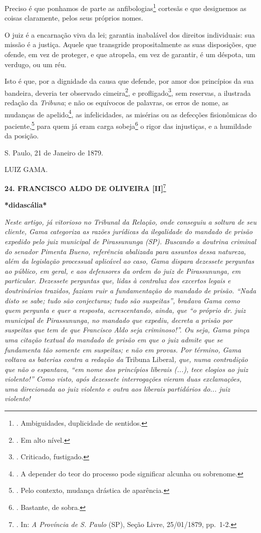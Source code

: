 Preciso é que ponhamos de parte as anfibologias\footnote{. Ambiguidades,
  duplicidade de sentidos.} cortesãs e que designemos as coisas
claramente, pelos seus próprios nomes.

O juiz é a encarnação viva da lei; garantia inabalável dos direitos
individuais: sua missão é a justiça. Aquele que transgride
propositalmente as suas disposições, que ofende, em vez de proteger, e
que atropela, em vez de garantir, é um déspota, um verdugo, ou um réu.

Isto é que, por a dignidade da causa que defende, por amor dos
princípios da sua bandeira, deveria ter observado cimeira\footnote{. Em
  alto nível.}, e profligado\footnote{. Criticado, fustigado.}, sem
reservas, a ilustrada redação da \emph{Tribuna}; e não os equívocos de
palavras, os erros de nome, as mudanças de apelido\footnote{. A depender
  do teor do processo pode significar alcunha ou sobrenome.}, as
infelicidades, as misérias ou as defecções fisionômicas do
paciente,\footnote{. Pelo contexto, mudança drástica de aparência.} para
quem já eram carga sobeja\footnote{. Bastante, de sobra.} o rigor das
injustiças, e a humildade da posição.

S. Paulo, 21 de Janeiro de 1879.

LUIZ GAMA.

\textbf{24. FRANCISCO ALDO DE OLIVEIRA {[}II{]}}\footnote{. In: \emph{A
  Província de S. Paulo} (SP), Seção Livre, 25/01/1879, pp.~1-2.}

\textbf{*didascália*}

\emph{Neste artigo, já vitorioso no Tribunal da Relação, onde conseguiu
a soltura de seu cliente, Gama categoriza as razões jurídicas da
ilegalidade do mandado de prisão expedido pelo juiz municipal de
Pirassununga (SP). Buscando a doutrina criminal do senador Pimenta
Bueno, referência abalizada para assuntos dessa natureza, além da
legislação processual aplicável ao caso, Gama dispara dezessete
perguntas ao público, em geral, e aos defensores da ordem do juiz de
Pirassununga, em particular. Dezessete perguntas que, lidas à contraluz
dos excertos legais e doutrinários trazidos, faziam ruir a fundamentação
do mandado de prisão. ``Nada disto se sabe; tudo são conjecturas; tudo
são suspeitas'', bradava Gama como quem pergunta e quer a resposta,
acrescentando, ainda, que ``o próprio dr. juiz municipal de
Pirassununga, no mandado que expediu, decreta a prisão por suspeitas que
tem de que Francisco Aldo seja criminoso!''. Ou seja, Gama pinça uma
citação textual do mandado de prisão em que o juiz admite que se
fundamenta tão somente em suspeitas; e não em provas. Por término, Gama
voltava as baterias contra a redação da} Tribuna Liberal\emph{, que,
numa contradição que não o espantava, ``em nome dos princípios liberais
(...), tece elogios ao juiz violento!'' Como visto, após dezessete
interrogações vieram duas exclamações, uma direcionada ao juiz violento
e outra aos liberais partidários do... juiz violento! }


